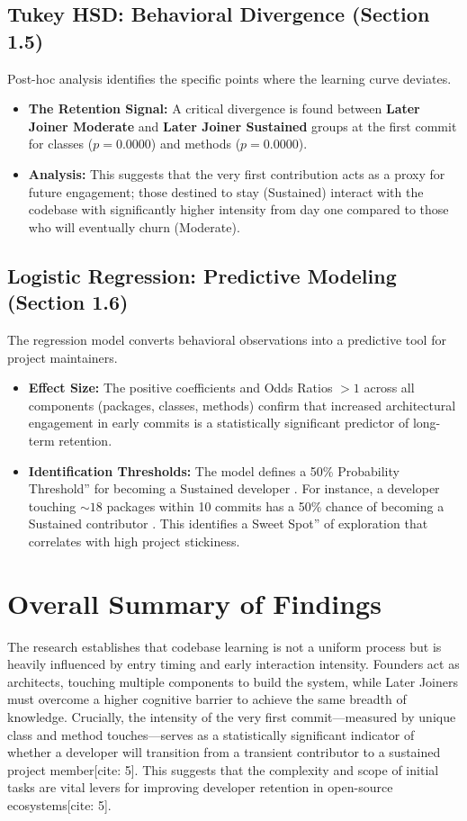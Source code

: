 \subsection{Tukey HSD: Behavioral Divergence (Section 1.5)}
Post-hoc analysis identifies the specific points where the learning curve deviates.
\begin{itemize}
\item \textbf{The Retention Signal:} A critical divergence is found between \textbf{Later Joiner Moderate} and \textbf{Later Joiner Sustained} groups at the first commit for classes ($p=0.0000$) and methods ($p=0.0000$).
\item \textbf{Analysis:} This suggests that the very first contribution acts as a proxy for future engagement; those destined to stay (Sustained) interact with the codebase with significantly higher intensity from day one compared to those who will eventually churn (Moderate).
\end{itemize}  \subsection{Logistic Regression: Predictive Modeling (Section 1.6)}
The regression model converts behavioral observations into a predictive tool for project maintainers.
\begin{itemize}
\item \textbf{Effect Size:} The positive coefficients and Odds Ratios $>1$ across all components (packages, classes, methods) confirm that increased architectural engagement in early commits is a statistically significant predictor of long-term retention.
\item \textbf{Identification Thresholds:} The model defines a 50\% Probability Threshold'' for becoming a Sustained developer  . For instance, a developer touching $\sim 18$ packages within 10 commits has a 50\% chance of becoming a Sustained contributor  . This identifies a Sweet Spot'' of exploration that correlates with high project stickiness.
\end{itemize}  
\section{Overall Summary of Findings}
The research establishes that codebase learning is not a uniform process but is heavily influenced by entry timing and early interaction intensity. Founders act as architects, touching multiple components to build the system, while Later Joiners must overcome a higher cognitive barrier to achieve the same breadth of knowledge. Crucially, the intensity of the very first commit—measured by unique class and method touches—serves as a statistically significant indicator of whether a developer will transition from a transient contributor to a sustained project member[cite: 5]. This suggests that the complexity and scope of initial tasks are vital levers for improving developer retention in open-source ecosystems[cite: 5].  